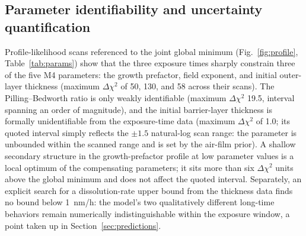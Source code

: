 \documentclass[preprint,12pt]{elsarticle}
\begin{document}
\subsection{Parameter identifiability and uncertainty quantification}\label{sec:identifiability}

Profile-likelihood scans referenced to the joint global minimum
(Fig.~\ref{fig:profile}, Table~\ref{tab:params}) show that the three
exposure times sharply constrain three of the five M4 parameters: the
growth prefactor, field exponent, and initial outer-layer thickness
(maximum $\Delta\chi^2$ of 50, 130, and 58 across their scans). The
Pilling--Bedworth ratio is only weakly identifiable (maximum
$\Delta\chi^2$ 19.5, interval spanning an order of magnitude), and the
initial barrier-layer thickness is formally unidentifiable from the
exposure-time data (maximum $\Delta\chi^2$ of 1.0; its quoted interval
simply reflects the $\pm1.5$ natural-log scan range: the
parameter is unbounded within the scanned range and is set by the
air-film prior). A shallow secondary structure in the growth-prefactor
profile at low parameter values is a local optimum of the compensating
parameters; it sits more than six $\Delta\chi^2$ units above the global
minimum and does not affect the quoted interval. Separately, an
explicit search for a dissolution-rate upper bound from the thickness
data finds no bound below 1~nm/h: the model's two qualitatively
different long-time behaviors remain numerically indistinguishable
within the exposure window, a point taken up in
Section~\ref{sec:predictions}.
\end{document}
